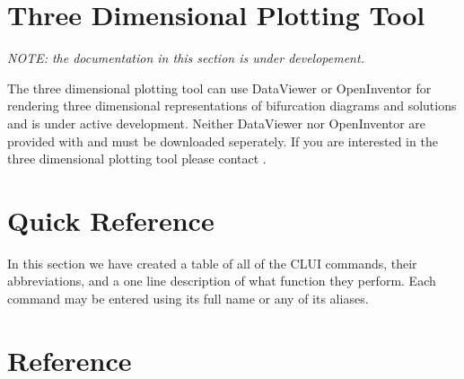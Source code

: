 \section{Three Dimensional Plotting Tool}
{\em NOTE:  the documentation in this section is under developement.}

The \AUTOc three dimensional plotting tool can use DataViewer or
OpenInventor for rendering three dimensional representations of
bifurcation diagrams and solutions and is under active development.
Neither DataViewer nor OpenInventor are provided with \AUTOc and must
be downloaded seperately.  If you are interested in the three
dimensional plotting tool please contact .


\clearpage

\pagebreak
\section{ Quick Reference } \label{sec:clui quick reference}

In this section we have created a table of all of the \AUTOc CLUI
commands, their abbreviations, and a one line description of what
function they perform.  Each command may be entered using 
its full name or any of its aliases.


\pagebreak
\section{ Reference }  \label{sec:clui reference}
















